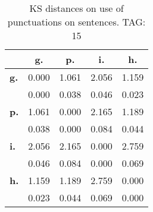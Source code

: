 \begin{table}[h!]
\begin{center}
\begin{tabular}{| l || c | c | c | c |}\hline
 & {\bf g.} & {\bf p.} & {\bf i.} & {\bf h.} \\\hline\hline
{\bf g.} & 0.000 & 1.061 & 2.056 & 1.159 \\
{\bf } & 0.000 & 0.038 & 0.046 & 0.023 \\\hline
{\bf p.} & 1.061 & 0.000 & 2.165 & 1.189 \\
{\bf } & 0.038 & 0.000 & 0.084 & 0.044 \\\hline
{\bf i.} & 2.056 & 2.165 & 0.000 & 2.759 \\
{\bf } & 0.046 & 0.084 & 0.000 & 0.069 \\\hline
{\bf h.} & 1.159 & 1.189 & 2.759 & 0.000 \\
{\bf } & 0.023 & 0.044 & 0.069 & 0.000 \\\hline
\end{tabular}
\caption{KS distances on use of punctuations on sentences. TAG: 15}
\end{center}
\end{table}